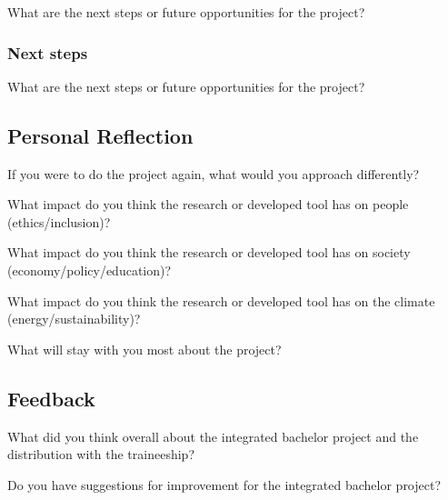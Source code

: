 What are the next steps or future opportunities for the project? \label{q} \newline


\subsubsection{Next steps}

What are the next steps or future opportunities for the project? \label{q} \newline


\subsection{Personal Reflection}

If you were to do the project again, what would you approach differently? \label{q} \newline

What impact do you think the research or developed tool has on people (ethics/inclusion)? \label{q} \newline

What impact do you think the research or developed tool has on society (economy/policy/education)? \label{q} \newline

What impact do you think the research or developed tool has on the climate (energy/sustainability)? \label{q} \newline

What will stay with you most about the project? \label{q} \newline



\subsection{Feedback}

What did you think overall about the integrated bachelor project and the distribution with the traineeship? \label{q} \newline

Do you have suggestions for improvement for the integrated bachelor project? \label{q} \newline
